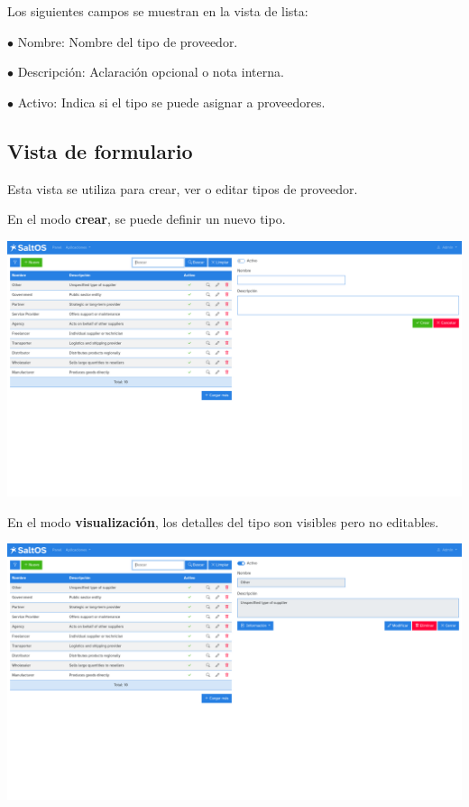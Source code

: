 \documentclass[a4paper]{article}
\begin{document}
Los siguientes campos se muestran en la vista de lista:

\begin{compactitem}
\item[\color{myblue}$\bullet$] Nombre: Nombre del tipo de proveedor.
\item[\color{myblue}$\bullet$] Descripción: Aclaración opcional o nota interna.
\item[\color{myblue}$\bullet$] Activo: Indica si el tipo se puede asignar a proveedores.
\end{compactitem}

\hypertarget{toc134}{}
\subsection{Vista de formulario}

Esta vista se utiliza para crear, ver o editar tipos de proveedor.

En el modo \textbf{crear}, se puede definir un nuevo tipo.

\begin{center}\includegraphics[width=1\textwidth]{../ujest/snaps/test-screenshots-js-screenshots-purchases-suppliers-types-create-es-es-1-snap.png}\end{center}

En el modo \textbf{visualización}, los detalles del tipo son visibles pero no editables.

\begin{center}\includegraphics[width=1\textwidth]{../ujest/snaps/test-screenshots-js-screenshots-purchases-suppliers-types-view-10-es-es-1-snap.png}\end{center}
\end{document}
